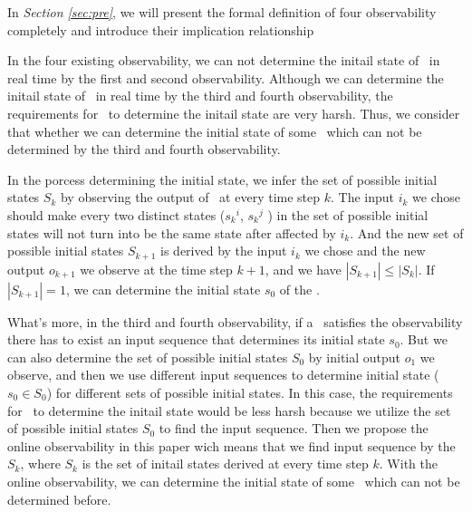

In {\em Section \ref{sec:pre}}, we will present the formal definition of four observability completely and introduce their implication relationship%

In the four existing observability, we can not determine the initail state of \BCNs\ in real time by the first and second observability. Although we can determine the initail state of \BCNs\ in real time by the third and fourth observability, the requirements for \BCNs\ to determine the initail state are very harsh. Thus, we consider that whether we can determine the initial state of some \BCNs\ which can not be determined by the third and fourth observability.

In the porcess determining the initial state, we infer the set of possible initial states $S_k$ by observing the output of \BCN\ at every time step $k$. The input $i_k$ we chose should make every two distinct states (${s_k}^i$, ${s_k}^j$ ) in the set of possible initial states will not turn into be the same state after affected by $i_k$. And the new set of possible initial states $S_{k+1}$ is derived by the input $i_k$ we chose and the new output $o_{k+1}$ we observe at the time step $k+1$, and we have $|S_{k+1}|\le|S_k|$. If $|S_{k+1}|=1$, we can determine the initial state $s_0$ of the \BCN.

What's more, in the third and fourth observability, if a \BCN\ satisfies the observability there has to exist an input sequence that determines its initial state $s_0$. But we can also determine the set of possible initial states $S_0$ by initial output $o_1$ we observe, and then we use different input sequences to determine initial state ($s_0\in S_0$) for different sets of possible initial states. In this case, the requirements for \BCNs\ to determine the initail state would be less harsh because we utilize the set of possible initial states $S_0$ to find the input sequence. Then we propose the online observability in this paper wich means that we find input sequence by the $S_k$, where $S_k$ is the set of initail states derived at every time step $k$. With the online observability, we can determine the initial state of some \BCNs\ which can not be determined before.

